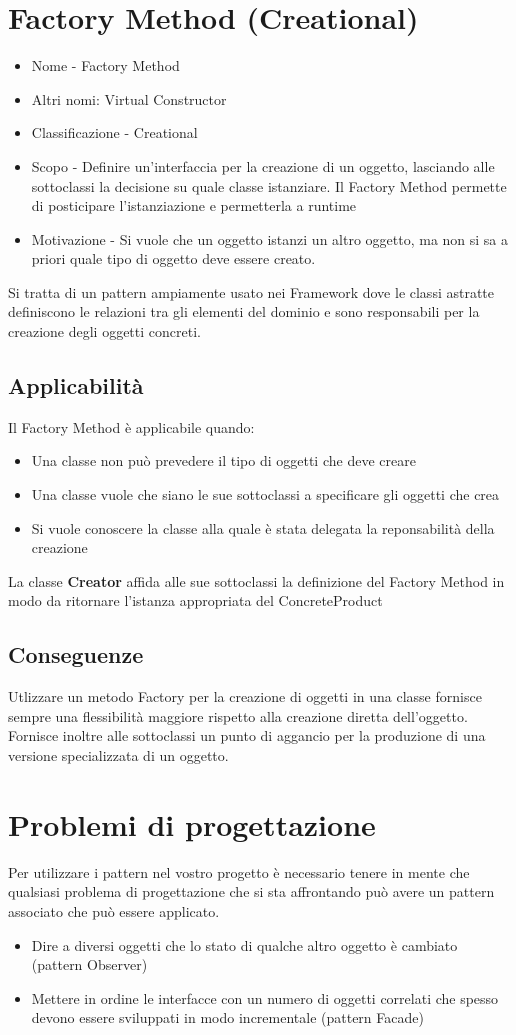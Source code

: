 \section{Factory Method (Creational)}
\begin{itemize}
    \item Nome - Factory Method
    \item Altri nomi: Virtual Constructor
    \item Classificazione - Creational
    \item Scopo - Definire un'interfaccia per la creazione di un oggetto, lasciando alle sottoclassi 
    la decisione su quale classe istanziare. Il Factory Method permette di posticipare l'istanziazione
    e permetterla a runtime
    \item Motivazione - Si vuole che un oggetto istanzi un altro oggetto, ma non si sa a priori quale
    tipo di oggetto deve essere creato.
\end{itemize}
Si tratta di un pattern ampiamente usato nei Framework dove le classi astratte definiscono le relazioni
tra gli elementi del dominio e sono responsabili per la creazione degli oggetti concreti.
\subsection*{Applicabilità}
Il Factory Method è applicabile quando:
\begin{itemize}
    \item Una classe non può prevedere il tipo di oggetti che deve creare
    \item Una classe vuole che siano le sue sottoclassi a specificare gli oggetti che crea
    \item Si vuole conoscere la classe alla quale è stata delegata la reponsabilità della creazione
\end{itemize}
La classe \textbf{Creator} affida alle sue sottoclassi la definizione del Factory Method in modo
da ritornare l'istanza appropriata del ConcreteProduct
\subsection*{Conseguenze}
Utlizzare un metodo Factory per la creazione di oggetti in una classe fornisce sempre una
flessibilità maggiore rispetto alla creazione diretta dell'oggetto. Fornisce inoltre alle sottoclassi
un punto di aggancio per la produzione di una versione specializzata di un oggetto.
\section{Problemi di progettazione}
Per utilizzare i pattern nel vostro progetto è necessario tenere in mente che qualsiasi problema di 
progettazione che si sta affrontando può avere un pattern associato che può essere applicato.
\begin{itemize}
    \item Dire a diversi oggetti che lo stato di qualche altro oggetto è cambiato (pattern Observer)
    \item Mettere in ordine le interfacce con un numero di oggetti correlati che spesso devono essere
    sviluppati in modo incrementale (pattern Facade)
\end{itemize}
